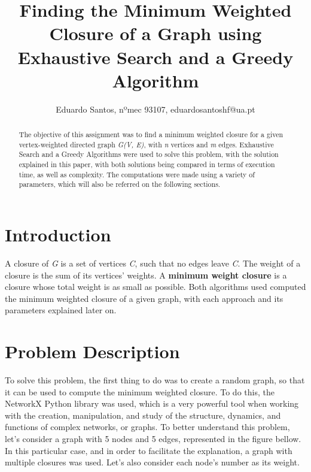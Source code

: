 \documentclass[...]{revdetua}
\begin{document}

\title{Finding the Minimum Weighted Closure of a Graph using Exhaustive Search and a Greedy Algorithm}
\author{Eduardo Santos, nºmec 93107, eduardosantoshf@ua.pt} %
\maketitle

\begin{abstract}
The objective of this assignment was to find a minimum weighted closure for a given vertex-weighted directed graph \textit{G(V, E)}, with \textit{n} vertices and \textit{m} edges. Exhaustive Search and a Greedy Algorithms were used to solve this problem, with the solution explained in this paper, with both solutions being compared in terms of execution time, as well as complexity. The computations were made using a variety of parameters, which will also be referred on the following sections.
\end{abstract}

\section{Introduction}

A closure of \textit{G} is a set of vertices \textit{C}, such that no edges leave \textit{C}. The weight of a closure is the sum of its vertices’ weights. A \textbf{minimum weight closure} is a closure whose total weight is as small as possible. Both algorithms used computed the minimum weighted closure of a given graph, with each approach and its parameters explained later on.

\section{ Problem Description}

To solve this problem, the first thing to do was to create a random graph, so that it can be used to compute the minimum weighted closure. To do this, the NetworkX Python library was used, which is a very powerful tool when working with the creation, manipulation, and study of the structure, dynamics, and functions of complex networks, or graphs.
To better understand this problem, let's consider a graph with 5 nodes and 5 edges, represented in the figure bellow. In this particular case, and in order to facilitate the explanation, a graph with multiple closures was used. Let's also consider each node's number as its weight. 
\end{document}
